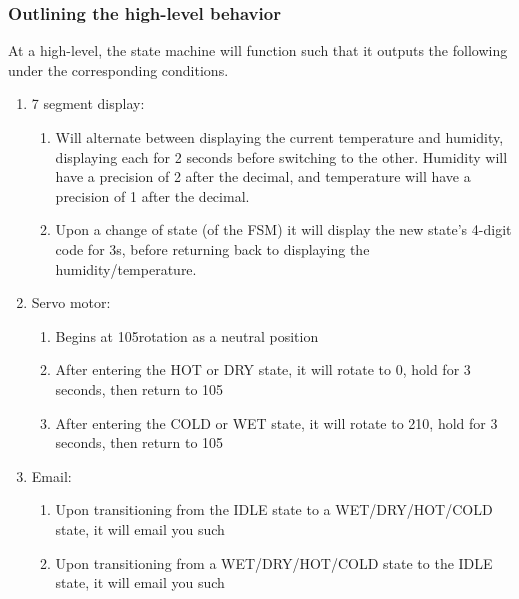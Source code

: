 \documentclass{article}
\begin{document}
    \subsubsection{Outlining the high-level behavior}
    At a high-level, the state machine will function such that it outputs the following under the corresponding conditions.
    \begin{enumerate}
      \item 7 segment display:
        \begin{enumerate}
          \item Will alternate between displaying the current temperature and humidity, displaying each for 2 seconds before switching to the other. Humidity will have a precision of 2 after the decimal, and temperature will have a precision of 1 after the decimal.
          \item Upon a change of state (of the FSM) it will display the new state's 4-digit code for 3s, before returning back to displaying the humidity/temperature.
        \end{enumerate}
      \item Servo motor:
        \begin{enumerate}
          \item Begins at 105\degree rotation as a neutral position
          \item After entering the HOT or DRY state, it will rotate to 0\degree, hold for 3 seconds, then return to 105\degree
          \item After entering the COLD or WET state, it will rotate to 210\degree, hold for 3 seconds, then return to 105\degree
        \end{enumerate}
      \item Email:
        \begin{enumerate}
          \item Upon transitioning from the IDLE state to a WET/DRY/HOT/COLD state, it will email you such
          \item Upon transitioning from a WET/DRY/HOT/COLD state to the IDLE state, it will email you such
        \end{enumerate}
    \end{enumerate}
\end{document}
